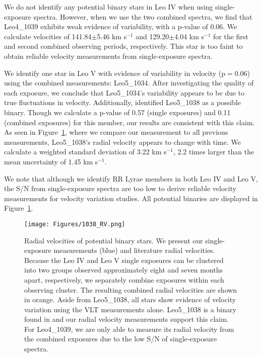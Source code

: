 \documentclass[twocolumn]{aastex63}
\newcommand{\revise}[1]{#1}
\begin{document}
We do not identify any potential binary stars in Leo IV when using single-exposure spectra. However, when we use the two combined spectra, we find that Leo4\_1039 exhibits weak evidence of variability, with a p-value of 0.06. We calculate velocities of 141.84$\pm$5.46 km s$^{-1}$ and 129.20$\pm$4.04 km s$^{-1}$ for the first and second combined observing periods, respectively. This star is too faint to obtain reliable velocity measurements from single-exposure spectra.

We identify one star in Leo V with evidence of variability in velocity \revise{(p$=$0.06)} using the combined measurements: Leo5\_1034. After investigating the quality of each exposure, we conclude that Leo5\_1034's variability appears to be due to true fluctuations in velocity. Additionally, \citet{mut2020} identified Leo5\_1038 as a possible binary. Though we calculate a p-value of 0.57 (single exposures) and 0.11 (combined exposures) for this member, our results are consistent with this claim. As seen in Figure~\ref{1038}, where we compare our measurement to all previous measurements, Leo5\_1038's radial velocity appears to change with time. We calculate a weighted standard deviation of 3.22 km s$^{-1}$, 2.2 times larger than the mean uncertainty of 1.45 km s$^{-1}$. 

We note that although we identify RR Lyrae members in both Leo IV and Leo V, the S/N from single-exposure spectra are too low to derive reliable velocity measurements for velocity variation studies. All potential binaries are displayed in Figure~\ref{1038}.

\begin{figure*}
\centering
\texttt{[image: Figures/1038\_RV.png]}
\caption{ Radial velocities of potential binary stars. We present our single-exposure measurements (blue) and literature radial velocities. Because the Leo IV and Leo V single exposures can be clustered into two groups observed approximately eight and seven months apart, respectively, we separately combine exposures within each observing cluster. The resulting combined radial velocities are shown in orange. Aside from Leo5\_1038, all stars show evidence of velocity variation using the VLT measurements alone. Leo5\_1038 is a binary found in \citet{mut2020} and our radial velocity measurements support this claim. For Leo4\_1039, we are only able to measure its radial velocity from the combined exposures due to the low S/N of single-exposure spectra. \label{1038}
}
\end{figure*}
\end{document}
